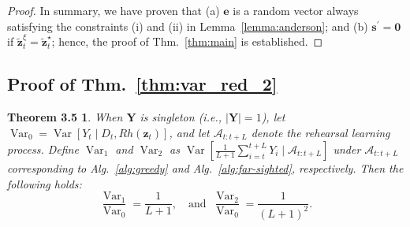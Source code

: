 \documentclass{article}
\theoremstyle{plain}
\newtheorem*{theorem35}{Theorem 3.5}
\theoremstyle{definition}
\theoremstyle{remark}
\def \ie {\textit{i.e.}}
\def \thm {Thm.}
\def \sA {\mathcal{A}}
\def \Y {\mathbf{Y}}
\def \s {\mathbf{s}}
\def \e {\mathbf{e}}
\def \z {\mathbf{z}}
\begin{document}
\begin{proof}
  In summary, we have proven that (a) \(\e\) is a random vector always satisfying the constraints (i) and (ii) in Lemma~\ref{lemma:anderson}; and (b) \(\s^\prime = \bm{0}\) if \(\tilde{\z}_t^\xi=\tilde{\z}_t^\star\); hence, the proof of Thm.~\ref{thm:main} is established.
\end{proof}




\subsection{Proof of \thm~\ref{thm:var_red_2}}
\label{app:proof_var}
\begin{theorem35}
When \(\Y\) is singleton (\ie, \(|\Y| = 1\)), let \(\operatorname{Var}_0 = \operatorname{Var}[Y_t \mid D_t, Rh(\z_t)]\), and let \(\sA_{t:t+L}\) denote the rehearsal learning process. 
Define \(\operatorname{Var}_1\) and \(\operatorname{Var}_2\) as \(\operatorname{Var}[\frac{1}{L+1}\sum_{i=t}^{t+L}Y_{i}\mid \sA_{t:t+L}]\) under \(\sA_{t:t+L}\) corresponding to Alg.~\ref{alg:greedy} and Alg.~\ref{alg:far-sighted}, respectively. Then the following holds:
  \[
    \frac{\operatorname{Var}_1}{\operatorname{Var}_0} = \frac{1}{L+1},\quad \text{and }\  \frac{\operatorname{Var}_2}{\operatorname{Var}_0} = \frac{1}{(L+1)^2}.
  \] 
\end{theorem35}
\end{document}
